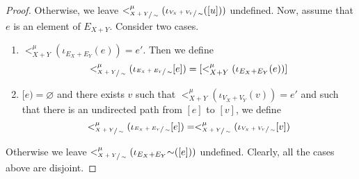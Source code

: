 \begin{proof}
    Otherwise, we leave $<_{\sfrac{X+Y}{\sim}}^{\mu}(\iota_{\sfrac{V_{X} + V_{Y}}{\sim}}([u]))$ undefined.
    Now, assume that $e$ is an element of $E_{X+Y}$.
    Consider two cases.
    \begin{enumerate}
    \item  $<_{X+Y}^{\mu}(\iota_{E_{X} + E_{Y}}(e)) = e'$.
            Then we define
        \[
            <_{\sfrac{X+Y}{\sim}}^{\mu}(\iota_{\sfrac{E_{X} + E_{Y}}{\sim}}[e]) = [<_{X+Y}^{\mu}(\iota_{E_{X} + E_{Y}}(e))]
        \]
    \item $[e) = \varnothing$ and there exists $v$ such that $<_{X+Y}^{\mu}(\iota_{V_{X} + V_{Y}}(v)) = e'$ and such that there is an undirected path from $[e]$ to $[v]$, we define 
        \[
            <_{\sfrac{X+Y}{\sim}}^{\mu}(\iota_{\sfrac{E_{X} + E_{Y}}{\sim}}[e]) = <_{\sfrac{X+Y}{\sim}}^{\mu}(\iota_{\sfrac{V_{X} + V_{Y}}{\sim}}[v])
        \] 
    \end{enumerate}
    Otherwise we leave $<_{\sfrac{X+Y}{\sim}}^{\mu}(\iota_{E_{X} + E_{Y}}{\sim}([e]))$ undefined.
    Clearly, all the cases above are disjoint.


\end{proof}
